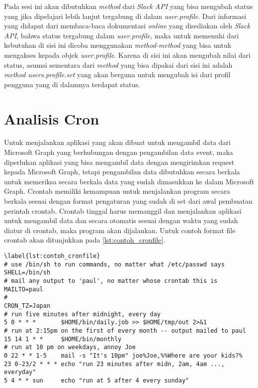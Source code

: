 Pada sesi ini akan dibutuhkan \textit{method} dari \textit{Slack API} yang bisa mengubah status yang jika dipelajari lebih lanjut tergabung di dalam \textit{user.profile}. Dari informasi yang didapat dari membaca-baca dokumentasi \textit{online} yang disediakan oleh \textit{Slack API}, bahwa status tergabung dalam \textit{user.profile}, maka untuk memenuhi dari kebutuhan di sisi ini dicoba menggunakan \textit{method-method} yang bisa untuk mengakses kepada objek \textit{user.profile}. Karena di sisi ini akan mengubah nilai dari status, asumsi sementara dari \textit{method} yang bisa dipakai dari sisi ini adalah \textit{method users.profile.set} yang akan berguna untuk mengubah isi dari profil pengguna yang di dalamnya terdapat status. 

\section{Analisis Cron}
\label{sec:analisis_cron}
Untuk menjalankan aplikasi yang akan dibuat untuk mengambil data dari Microsoft Graph yang berhubungan dengan pengambilan data event, maka diperlukan aplikasi yang bisa mengambil data dengan mengirimkan request kepada Microsoft Graph, tetapi pengambilan data dibutuhkan secara berkala untuk memeriksa secara berkala data yang sudah dimasukkan ke dalam Microsoft Graph. Crontab memiliki kemampuan untuk menjalankan program secara berkala sesuai dengan format pengaturan yang sudah di set dari awal pembuatan perintah crontab. Crontab tinggal harus memanggil dan menjalankan aplikasi untuk mengambil data dan secara otomatis sesuai dengan waktu yang sudah diatur di crontab, maka program akan dijalankan. Untuk contoh format file crontab akan ditunjukkan pada \ref{lst:contoh_cronfile}.

\begin{lstlisting}[caption=contoh cronfile]
\label{lst:contoh_cronfile}
# use /bin/sh to run commands, no matter what /etc/passwd says
SHELL=/bin/sh
# mail any output to 'paul', no matter whose crontab this is
MAILTO=paul
#
CRON_TZ=Japan
# run five minutes after midnight, every day
5 0 * * *       $HOME/bin/daily.job >> $HOME/tmp/out 2>&1
# run at 2:15pm on the first of every month -- output mailed to paul
15 14 1 * *     $HOME/bin/monthly
# run at 10 pm on weekdays, annoy Joe
0 22 * * 1-5    mail -s "It's 10pm" joe%Joe,%%Where are your kids?%
23 0-23/2 * * * echo "run 23 minutes after midn, 2am, 4am ..., everyday"
5 4 * * sun     echo "run at 5 after 4 every sunday"
\end{lstlisting}
